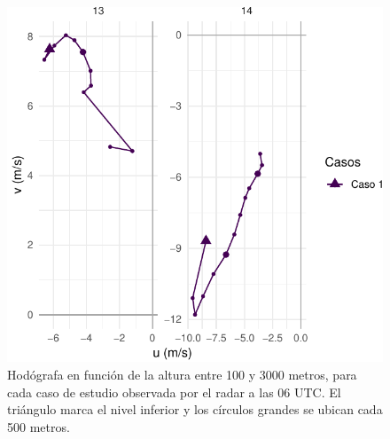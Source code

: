 \documentclass[12pt,spanish,oneside, a4paper]{book}
\begin{document}
\begin{figure}

{\centering \includegraphics{00_Paper_files/figure-latex/hodografa-horaria-1} 

}

\caption{Hodógrafa en función de la altura entre 100 y 3000 metros, para cada caso de estudio observada por el radar a las 06 UTC. El triángulo marca el nivel inferior y los círculos grandes se ubican cada 500 metros. \label{hodografa-h}}\label{fig:hodografa-horaria}
\end{figure}
\end{document}
